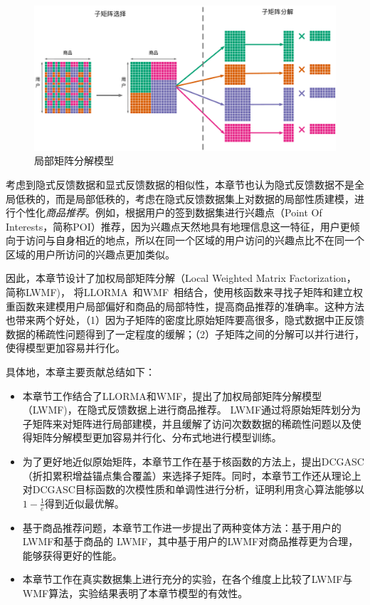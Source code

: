 \begin{figure}
	\centering
	\includegraphics[width=1.0\textwidth]{Fig/lwmf/lmf}	
	\caption{局部矩阵分解模型}
	\label{fig-lwmf-lmf}
\end{figure}

考虑到隐式反馈数据和显式反馈数据的相似性，本章节也认为隐式反馈数据不是全局低秩的，而是局部低秩的，考虑在隐式反馈数据集上对数据的局部性质建模，进行个性化\textit{商品推荐}。例如，根据用户的签到数据集进行兴趣点（Point Of Interests，简称POI）推荐，因为兴趣点天然地具有地理信息这一特征，用户更倾向于访问与自身相近的地点，所以在同一个区域的用户访问的兴趣点比不在同一个区域的用户所访问的兴趣点更加类似。

因此，本章节设计了加权局部矩阵分解（Local Weighted Matrix Factorization，简称LWMF)， 将LLORMA~\cite{lee2013local,lee2014local}和WMF~\cite{hu2008collaborative}相结合，使用核函数来寻找子矩阵和建立权重函数来建模用户局部偏好和商品的局部特性，提高商品推荐的准确率。这种方法也带来两个好处，（1）因为子矩阵的密度比原始矩阵要高很多，隐式数据中正反馈数据的稀疏性问题得到了一定程度的缓解；（2）子矩阵之间的分解可以并行进行，使得模型更加容易并行化。


具体地，本章主要贡献总结如下：
\begin{itemize}
	\item 本章节工作结合了LLORMA和WMF，提出了加权局部矩阵分解模型（LWMF)，在隐式反馈数据上进行商品推荐。 LWMF通过将原始矩阵划分为子矩阵来对矩阵进行局部建模，并且缓解了访问次数数据的稀疏性问题以及使得矩阵分解模型更加容易并行化、分布式地进行模型训练。
	\item 为了更好地近似原始矩阵，本章节工作在基于核函数的方法上，提出DCGASC（折扣累积增益锚点集合覆盖）来选择子矩阵。同时，本章节工作还从理论上对DCGASC目标函数的次模性质和单调性进行分析，证明利用贪心算法能够以$1-\frac{1}{e}$得到近似最优解。
	\item 基于商品推荐问题，本章节⼯作进⼀步提出了两种变体方法：基于⽤户的 LWMF和基于商品的 LWMF，其中基于用户的LWMF对商品推荐更为合理，能够获得更好的性能。
	\item 本章节工作在真实数据集上进行充分的实验，在各个维度上比较了LWMF与WMF算法，实验结果表明了本章节模型的有效性。
\end{itemize}






